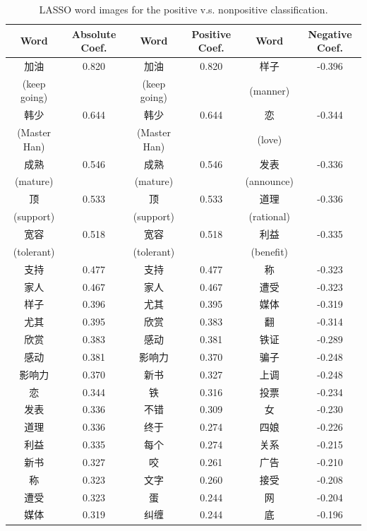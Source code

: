 \documentclass[11pt]{article}
\newcommand{\1}[1]{{\mathbf 1}\left\{#1\right\}}        %
\begin{document}
\begin{table}[!h]
\caption{LASSO word images for the positive v.s. nonpositive classification.}
\begin{center}
\begin{tabular}{|c|c||c|c||c|c|}
\hline
Word & Absolute Coef. & Word & Positive Coef. & Word & Negative Coef.\\ \hline \hline
加油 & 0.820 & 加油 & 0.820 & 样子 & -0.396\\
(keep going) & & (keep going) & & (manner) & \\\hline
韩少 & 0.644 & 韩少 & 0.644 & 恋 & -0.344\\
(Master Han) & & (Master Han) & & (love) & \\\hline
成熟 & 0.546 & 成熟 & 0.546 & 发表 & -0.336\\
(mature) & & (mature) & & (announce) & \\\hline
顶 & 0.533 & 顶 & 0.533 & 道理 & -0.336\\
(support) & & (support) & & (rational) & \\\hline
宽容 & 0.518 & 宽容 & 0.518 & 利益 & -0.335\\
(tolerant) & & (tolerant) & & (benefit) & \\\hline
支持 & 0.477 & 支持 & 0.477 & 称 & -0.323\\ \hline
家人 & 0.467 & 家人 & 0.467 & 遭受 & -0.323\\ \hline
样子 & 0.396 & 尤其 & 0.395 & 媒体 & -0.319\\ \hline
尤其 & 0.395 & 欣赏 & 0.383 & 翻 & -0.314\\ \hline
欣赏 & 0.383 & 感动 & 0.381 & 铁证 & -0.289\\ \hline
感动 & 0.381 & 影响力 & 0.370 & 骗子 & -0.248\\ \hline
影响力 & 0.370 & 新书 & 0.327 & 上调 & -0.248\\ \hline
恋 & 0.344 & 铁 & 0.316 & 投票 & -0.234\\ \hline
发表 & 0.336 & 不错 & 0.309 & 女 & -0.230\\ \hline
道理 & 0.336 & 终于 & 0.274 & 四娘 & -0.226\\ \hline
利益 & 0.335 & 每个 & 0.274 & 关系 & -0.215\\ \hline
新书 & 0.327 & 咬 & 0.261 & 广告 & -0.210\\ \hline
称 & 0.323 & 文字 & 0.260 & 接受 & -0.208\\ \hline
遭受 & 0.323 & 蛋 & 0.244 & 网 & -0.204\\ \hline
媒体 & 0.319 & 纠缠 & 0.244 & 底 & -0.196\\ \hline
\end{tabular}
\label{tb:lassofullpos}
\end{center}
\end{table}
\end{document}
